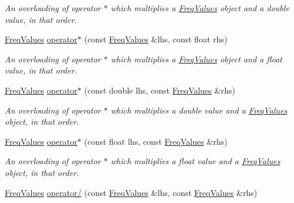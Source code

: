 \begin{DoxyCompactItemize}
\begin{DoxyCompactList}\small\item\em An overloading of operator $\ast$ which multiplies a {\itshape \hyperlink{structFreqValues}{Freq\+Values}} object and a {\itshape double} value, in that order. \end{DoxyCompactList}\item 
\mbox{\label{structFreqValues_aea565aadf51307e09845c72179e5082d}} 
\hyperlink{structFreqValues}{Freq\+Values} \hyperlink{structFreqValues_aea565aadf51307e09845c72179e5082d}{operator$\ast$} (const \hyperlink{structFreqValues}{Freq\+Values} \&lhs, const float rhs)
\begin{DoxyCompactList}\small\item\em An overloading of operator $\ast$ which multiplies a {\itshape \hyperlink{structFreqValues}{Freq\+Values}} object and a {\itshape float} value, in that order. \end{DoxyCompactList}\item 
\hyperlink{structFreqValues}{Freq\+Values} \hyperlink{structFreqValues_a1e7f2019d7cdca3a4feb63014297baab}{operator$\ast$} (const double lhs, const \hyperlink{structFreqValues}{Freq\+Values} \&rhs)
\begin{DoxyCompactList}\small\item\em An overloading of operator $\ast$ which multiplies a {\itshape double} value and a {\itshape \hyperlink{structFreqValues}{Freq\+Values}} object, in that order. \end{DoxyCompactList}\item 
\mbox{\label{structFreqValues_ab9bb62425b97f45a5eb485cf745bfe4a}} 
\hyperlink{structFreqValues}{Freq\+Values} \hyperlink{structFreqValues_ab9bb62425b97f45a5eb485cf745bfe4a}{operator$\ast$} (const float lhs, const \hyperlink{structFreqValues}{Freq\+Values} \&rhs)
\begin{DoxyCompactList}\small\item\em An overloading of operator $\ast$ which multiplies a {\itshape float} value and a {\itshape \hyperlink{structFreqValues}{Freq\+Values}} object, in that order. \end{DoxyCompactList}\item 
\hyperlink{structFreqValues}{Freq\+Values} \hyperlink{structFreqValues_a26f13922dd72ad292bea45072abc2c96}{operator/} (const \hyperlink{structFreqValues}{Freq\+Values} \&lhs, const \hyperlink{structFreqValues}{Freq\+Values} \&rhs)

\end{DoxyCompactItemize}
